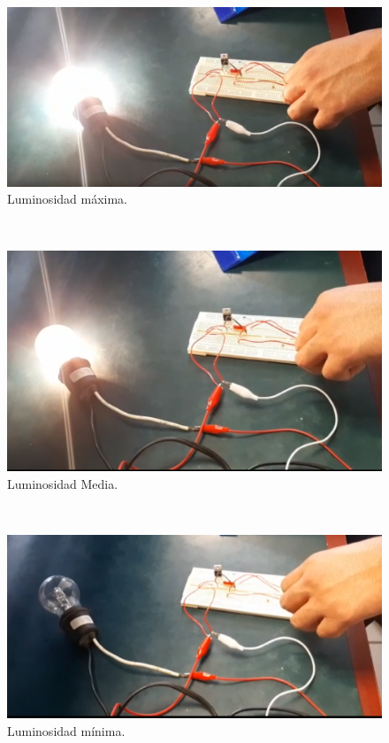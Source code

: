 \documentclass[12pt,letterpaper]{article}
\begin{document}
\begin{figure}[h!]
\begin{center}
\includegraphics[scale=0.5]{Luminosidad-AltaR.png} 
\caption{Luminosidad máxima.}
\end{center}
\end{figure}

\
\begin{figure}[h!]
\begin{center}
\includegraphics[scale=0.5]{Luminosidad-Media.png} 
\caption{Luminosidad Media.}
\end{center}
\end{figure}

\
\begin{figure}
\begin{center}
\includegraphics[scale=0.5]{Luminosidad-minima.png} 
\caption{Luminosidad mínima.}
\end{center}
\end{figure}
\end{document}
